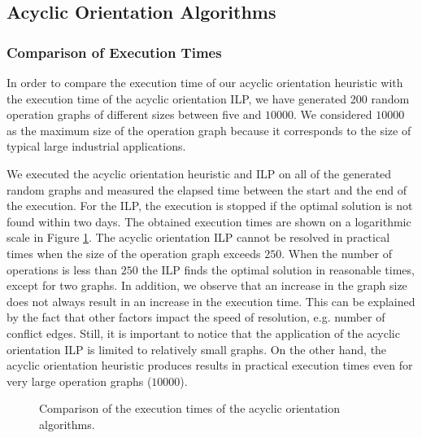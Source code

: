 \subsection{Acyclic Orientation Algorithms}

\subsubsection{Comparison of Execution Times}

In order to compare the execution time of our acyclic orientation heuristic with the execution time of the acyclic orientation ILP, we have generated 200 random operation graphs of different sizes between five and $10000$. %
We considered $10000$ as the maximum size of the operation graph because it corresponds to the size of typical large industrial applications. 

We executed the acyclic orientation heuristic and ILP on all of the generated random graphs and measured the elapsed time between the start and the end of the execution. For the ILP, the execution is stopped if the optimal solution is not found within two days. The obtained execution times are shown on a logarithmic scale in Figure \ref{fig:orient_exec}. The acyclic orientation ILP cannot be resolved in practical times when the size of the operation graph exceeds $250$. When the number of operations is less than $250$ the ILP finds the optimal solution in reasonable times, except for two graphs. In addition, we observe that an increase in the graph size does not always result in an increase in the execution time. This can be explained by the fact that other factors impact the speed of resolution, e.g. number of conflict edges. Still, it is important to notice that the application of the acyclic orientation ILP is limited to relatively small graphs. On the other hand, the acyclic orientation heuristic produces results in practical execution times even for very large operation graphs ($10000$).

\begin{figure}[phbt]
\centering

\caption{Comparison of the execution times of the acyclic orientation algorithms.}
\label{fig:orient_exec}
\end{figure} 
 
